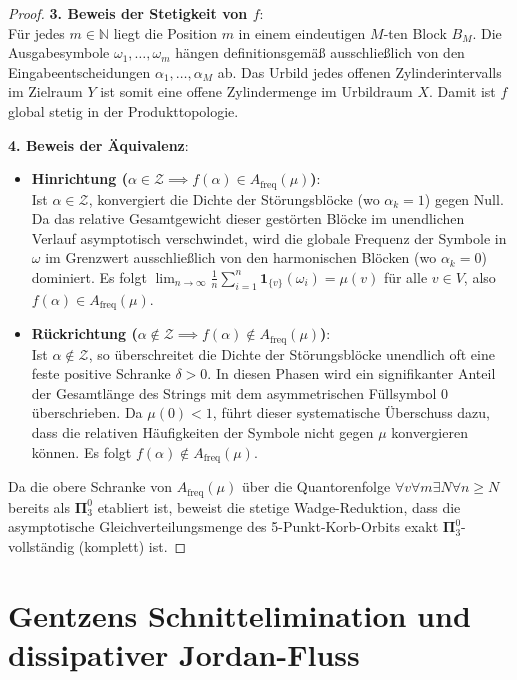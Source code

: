 \documentclass[11pt,a4paper]{article}
\numberwithin{equation}{section}
\begin{document}
\begin{proof}
		\noindent\textbf{3. Beweis der Stetigkeit von $f$}: \\
		Für jedes $m \in \mathbb{N}$ liegt die Position $m$ in einem eindeutigen $M$-ten Block $B_M$. Die Ausgabesymbole $\omega_1, \dots, \omega_m$ hängen definitionsgemäß ausschließlich von den Eingabeentscheidungen $\alpha_1, \dots, \alpha_M$ ab. Das Urbild jedes offenen Zylinderintervalls im Zielraum $Y$ ist somit eine offene Zylindermenge im Urbildraum $X$. Damit ist $f$ global stetig in der Produkttopologie.
		
		\noindent\textbf{4. Beweis der Äquivalenz}:
		\begin{itemize}
			\item \textbf{Hinrichtung ($\alpha \in \mathcal{Z} \implies f(\alpha) \in A_{\mathrm{freq}}(\mu)$)}: \\
			Ist $\alpha \in \mathcal{Z}$, konvergiert die Dichte der Störungsblöcke (wo $\alpha_k = 1$) gegen Null. Da das relative Gesamtgewicht dieser gestörten Blöcke im unendlichen Verlauf asymptotisch verschwindet, wird die globale Frequenz der Symbole in $\omega$ im Grenzwert ausschließlich von den harmonischen Blöcken (wo $\alpha_k = 0$) dominiert. Es folgt $\lim_{n \to \infty} \frac{1}{n} \sum_{i=1}^n \mathbf{1}_{\{v\}}(\omega_i) = \mu(v)$ für alle $v \in V$, also $f(\alpha) \in A_{\mathrm{freq}}(\mu)$.
			\item \textbf{Rückrichtung ($\alpha \notin \mathcal{Z} \implies f(\alpha) \notin A_{\mathrm{freq}}(\mu)$)}: \\
			Ist $\alpha \notin \mathcal{Z}$, so überschreitet die Dichte der Störungsblöcke unendlich oft eine feste positive Schranke $\delta > 0$. In diesen Phasen wird ein signifikanter Anteil der Gesamtlänge des Strings mit dem asymmetrischen Füllsymbol $0$ überschrieben. Da $\mu(0) < 1$, führt dieser systematische Überschuss dazu, dass die relativen Häufigkeiten der Symbole nicht gegen $\mu$ konvergieren können. Es folgt $f(\alpha) \notin A_{\mathrm{freq}}(\mu)$.
		\end{itemize}
		Da die obere Schranke von $A_{\mathrm{freq}}(\mu)$ über die Quantorenfolge $\forall v \forall m \exists N \forall n \ge N$ bereits als $\mathbf{\Pi}^0_3$ etabliert ist, beweist die stetige Wadge-Reduktion, dass die asymptotische Gleichverteilungsmenge des 5-Punkt-Korb-Orbits exakt $\mathbf{\Pi}^0_3$-vollständig (komplett) ist.
	\end{proof}
	
	\section{Gentzens Schnittelimination und dissipativer Jordan-Fluss}
	
\end{document}

